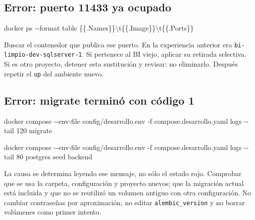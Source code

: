\documentclass[
  spanish,
  10pt,
  a4paper,
]{article}
\newenvironment{Shaded}{}{}
\newcommand{\AttributeTok}[1]{#1}
\newcommand{\ExtensionTok}[1]{#1}
\newcommand{\NormalTok}[1]{#1}
\newcommand{\StringTok}[1]{#1}
\renewenvironment{Shaded}{\begin{snugshade}}{\end{snugshade}}%
\begin{document}
\subsection{Error: puerto 11433 ya
ocupado}\label{error-puerto-11433-ya-ocupado}

\begin{Shaded}
\begin{Highlighting}[]
\ExtensionTok{docker}\NormalTok{ ps }\AttributeTok{{-}{-}format} \StringTok{\textquotesingle{}table \{\{.Names\}\}\textbackslash{}t\{\{.Image\}\}\textbackslash{}t\{\{.Ports\}\}\textquotesingle{}}
\end{Highlighting}
\end{Shaded}

Buscar el contenedor que publica ese puerto. En la experiencia anterior
era \texttt{bi-limpio-dev-sqlserver-1}. Si pertenece al BI viejo,
aplicar su retirada selectiva. Si es otro proyecto, detener esta
sustitución y revisar: no eliminarlo. Después repetir el \texttt{up} del
ambiente nuevo.

\subsection{Error: migrate terminó con código
1}\label{error-migrate-terminuxf3-con-cuxf3digo-1}

\begin{Shaded}
\begin{Highlighting}[]
\ExtensionTok{docker}\NormalTok{ compose }\AttributeTok{{-}{-}env{-}file}\NormalTok{ config/desarrollo.env }\AttributeTok{{-}f}\NormalTok{ compose.desarrollo.yaml logs }\AttributeTok{{-}{-}tail}\NormalTok{ 120 migrate}
\end{Highlighting}
\end{Shaded}

\begin{Shaded}
\begin{Highlighting}[]
\ExtensionTok{docker}\NormalTok{ compose }\AttributeTok{{-}{-}env{-}file}\NormalTok{ config/desarrollo.env }\AttributeTok{{-}f}\NormalTok{ compose.desarrollo.yaml logs }\AttributeTok{{-}{-}tail}\NormalTok{ 80 postgres seed backend}
\end{Highlighting}
\end{Shaded}

La causa se determina leyendo ese mensaje, no sólo el estado rojo.
Comprobar que se usa la carpeta, configuración y proyecto nuevos; que la
migración actual está incluida y que no se reutilizó un volumen antiguo
con otra configuración. No cambiar contraseñas por aproximación, no
editar \texttt{alembic\_version} y no borrar volúmenes como primer
intento.
\end{document}

